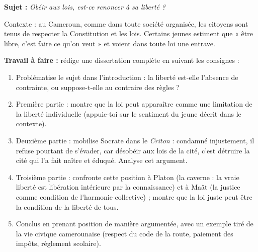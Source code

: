 \documentclass[11pt]{article}
\begin{document}
\begin{exercice}
\textbf{Sujet :} \emph{Obéir aux lois, est-ce renoncer à sa liberté ?}

\medskip
Contexte : au Cameroun, comme dans toute société organisée, les citoyens sont tenus de respecter la Constitution et les lois. Certains jeunes estiment que « être libre, c'est faire ce qu'on veut » et voient dans toute loi une entrave.

\medskip
\textbf{Travail à faire :} rédige une dissertation complète en suivant les consignes :
\begin{enumerate}
\item Problématise le sujet dans l'introduction : la liberté est-elle l'absence de contrainte, ou suppose-t-elle au contraire des règles ?
\item Première partie : montre que la loi peut apparaître comme une limitation de la liberté individuelle (appuie-toi sur le sentiment du jeune décrit dans le contexte).
\item Deuxième partie : mobilise Socrate dans le \emph{Criton} : condamné injustement, il refuse pourtant de s'évader, car désobéir aux lois de la cité, c'est détruire la cité qui l'a fait naître et éduqué. Analyse cet argument.
\item Troisième partie : confronte cette position à Platon (la caverne : la vraie liberté est libération intérieure par la connaissance) et à Maât (la justice comme condition de l'harmonie collective) ; montre que la loi juste peut être la condition de la liberté de tous.
\item Conclus en prenant position de manière argumentée, avec un exemple tiré de la vie civique camerounaise (respect du code de la route, paiement des impôts, règlement scolaire).
\end{enumerate}
\end{exercice}
\end{document}

